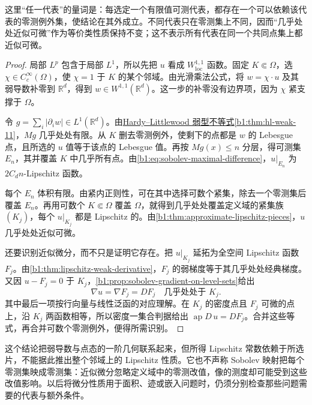 这里“任一代表”的量词是：每选定一个有限值可测代表，都存在一个可以依赖该代表的零测例外集，使结论在其外成立。不同代表只在零测集上不同，因而“几乎处处近似可微”作为等价类性质保持不变；这不表示所有代表在同一个共同点集上都近似可微。

\begin{proof}
局部 \(L^p\) 包含于局部 \(L^1\)，所以先把 \(u\) 看成 \(W^{1,1}_{\mathrm{loc}}\) 函数。固定 \(K\Subset\Omega\)，选 \(\chi\in C_c^\infty(\Omega)\)，使 \(\chi=1\) 于 \(K\) 的某个邻域。由光滑乘法公式，将 \(w=\chi\cdot u\) 及其弱导数补零到 \(\mathbb R^d\)，得到 \(w\in W^{1,1}(\mathbb R^d)\)。这一步的补零没有边界项，因为 \(\chi\) 紧支撑于 \(\Omega\)。

令 \(g=\sum_i|\partial_iw|\in L^1(\mathbb R^d)\)。由\hyperref[b1:thm:hl-weak-11]{Hardy--Littlewood 弱型不等式\ref*{b1:thm:hl-weak-11}}，\(Mg\) 几乎处处有限。从 \(K\) 删去零测例外，使剩下的点都是 \(w\) 的 Lebesgue 点，且所选的 \(u\) 值等于该点的 Lebesgue 值。再按 \(Mg(x)\leq n\) 分层，得可测集 \(E_n\)，其并覆盖 \(K\) 中几乎所有点。由\eqref{b1:eq:sobolev-maximal-difference}，\(u|_{E_n}\) 为 \(2C_dn\)-Lipschitz 函数。

每个 \(E_n\) 体积有限。由紧内正则性，可在其中选择可数个紧集，除去一个零测集后覆盖 \(E_n\)。再用可数个 \(K\Subset\Omega\) 覆盖 \(\Omega\)，就得到几乎处处覆盖定义域的紧集族 \((K_j)\)，每个 \(u|_{K_j}\) 都是 Lipschitz 的。由\cref{b1:thm:approximate-lipschitz-pieces}，\(u\) 几乎处处近似可微。

还要识别近似微分，而不只是证明它存在。把 \(u|_{K_j}\) 延拓为全空间 Lipschitz 函数 \(F_j\)。由\cref{b1:thm:lipschitz-weak-derivative}，\(F_j\) 的弱梯度等于其几乎处处经典梯度。又因 \(u-F_j=0\) 于 \(K_j\)，\cref{b1:prop:sobolev-gradient-on-level-sets}给出
\[
 \nabla u=\nabla F_j=DF_j
 \quad\text{几乎处处于 }K_j.
\]
其中最后一项按行向量与线性泛函的对应理解。在 \(K_j\) 的密度点且 \(F_j\) 可微的点上，沿 \(K_j\) 两函数相等，所以密度一集合判据给出 \(\operatorname{ap}D\,u=DF_j\)。合并这些等式，再合并可数个零测例外，便得所需识别。
\end{proof}

这个结论把弱导数与点态的一阶几何联系起来，但所得 Lipschitz 常数依赖于所选片，不能据此推出整个邻域上的 Lipschitz 性质。它也不声称 Sobolev 映射把每个零测集映成零测集：近似微分忽略定义域中的零测改值，像的测度却可能受到这些改值影响。以后将微分性质用于面积、迹或嵌入问题时，仍须分别检查那些问题需要的代表与额外条件。
